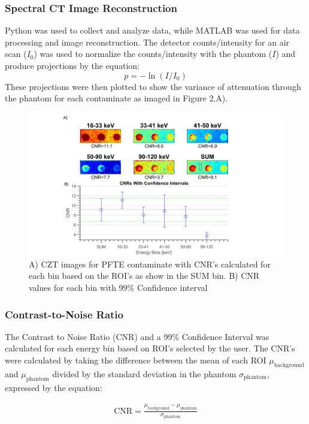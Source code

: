 \documentclass[a4paper,11pt]{article}
\begin{document}
\subsubsection{Spectral CT Image Reconstruction}
Python was used to collect and analyze data, while MATLAB was used for data processing and image reconstruction. The detector counts/intensity for an air scan ($I_0$) was used to normalize the counts/intensity with the phantom ($I$) and produce projections by the equation: 
\begin{equation}
    p = -\ln(I/I_0)
\end{equation}
These projections were then plotted to show the variance of attenuation through the phantom for each contaminate as imaged in Figure 2.A). 

\begin{figure}[htbp]
\includegraphics[width=\textwidth]{PTFE(Left).jpg}
\caption{A) CZT images for PFTE contaminate with CNR's calculated for each bin based on the ROI's as show in the SUM bin. B) CNR values for each bin with 99\% Confidence interval}
\label{figcali}
\end{figure}


\subsubsection{Contrast-to-Noise Ratio}
The Contrast to Noise Ratio (CNR) and a 99\% Confidence Interval was calculated for each energy bin based on ROI's selected by the user. The CNR's were calculated by taking the difference between the mean of each ROI $\mu_{\mathrm{background}}$ and $\mu_{\mathrm{phantom}}$ divided by the standard deviation in the phantom $\sigma_{\mathrm{phantom}}$, expressed by the equation: 

\begin{align}
    \mathrm{CNR} = \frac{\mu_{\mathrm{background}} - \mu_{\mathrm{phantom}}}{\sigma_{\mathrm{phantom}}} \\
\end{align}
\end{document}
